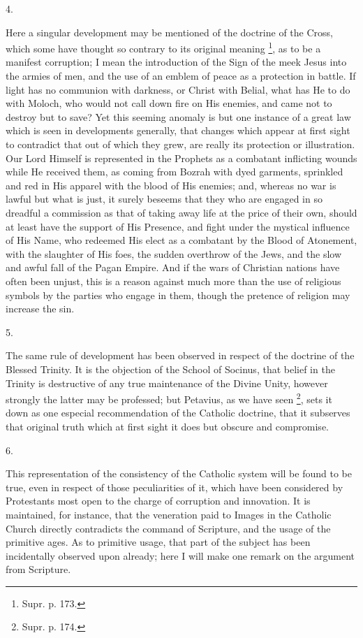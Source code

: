 4.

Here a singular development may be mentioned of the doctrine of the
Cross, which some have thought so contrary to its original meaning \footnote{Supr. p. 173.}, as to be a manifest corruption; I mean the introduction of
the Sign of the meek Jesus into the armies of men, and the use of an
emblem of peace as a protection in battle. If light has no communion
with darkness, or Christ with Belial, what has He to do with Moloch,
who would not call down fire on His enemies, and came not to destroy
but to save? Yet this seeming anomaly is but one instance of a great
law which is seen in developments generally, that changes which appear
at first sight to contradict that out of which they grew, are really
its protection or illustration. Our Lord Himself is represented in the
Prophets as a combatant inflicting wounds while He received them, as
coming from Bozrah with dyed garments, sprinkled and red in His
apparel with the blood of His enemies; and, whereas no war is lawful
but what is just, it surely beseems that they who are engaged in so
dreadful a commission as that of taking away life at the price of
their own, should at least have the support of His Presence, and fight
under the mystical influence of His Name, who redeemed His elect as a
combatant by the Blood of Atonement, with the slaughter of His foes,
the sudden overthrow of the Jews, and the slow and awful fall of the
Pagan Empire. And if the wars of Christian nations have often been
unjust, this is a reason against much more than the use of religious
symbols by the parties who engage in them, though the pretence of
religion may increase the sin.

5.

The same rule of development has been observed in respect of the
doctrine of the Blessed Trinity. It is the objection of the School of
Socinus, that belief in the Trinity is destructive of any true
maintenance of the Divine Unity, however strongly the latter may be
professed; but Petavius, as we have seen \footnote{Supr. p. 174.}, sets it down as one especial recommendation of the Catholic
doctrine, that it subserves that original truth which at first sight
it does but obscure and compromise.

6.

This representation of the consistency of the Catholic system will
be found to be true, even in respect of those peculiarities of it,
which have been considered by Protestants most open to the charge of
corruption and innovation. It is maintained, for instance, that the
veneration paid to Images in the Catholic Church directly contradicts
the command of Scripture, and the usage of the primitive ages. As to
primitive usage, that part of the subject has been incidentally
observed upon already; here I will make one remark on the argument
from Scripture.

